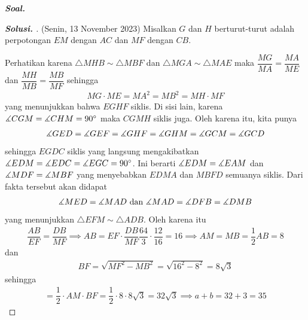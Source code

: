 \textbf{\textit{Soal. }}
\begin{proof}[\textbf{Solusi. }] (Senin, 13 November 2023) Misalkan $G$ dan $H$ berturut-turut adalah perpotongan $EM$ dengan $AC$ dan $MF$ dengan $CB$. 
% 

Perhatikan karena $\triangle MHB \sim \triangle MBF$ dan $\triangle MGA \sim \triangle MAE$ maka $\dfrac{MG}{MA} = \dfrac{MA}{ME}$ dan $\dfrac{MH}{MB}=\dfrac{MB}{MF}$ sehingga
\begin{align*}
    MG \cdot ME = MA^2 = MB^2 = MH \cdot MF
\end{align*}
yang menunjukkan bahwa $EGHF$ siklis.  Di sisi lain, karena $\measuredangle CGM = \measuredangle CHM = 90^\circ$ maka $CGMH$ siklis juga. Oleh karena itu, kita punya
\begin{align*}
    \measuredangle GED = \measuredangle GEF = \measuredangle GHF = \measuredangle GHM = \measuredangle GCM = \measuredangle GCD
\end{align*}
sehingga $EGDC$ siklis yang langsung mengakibatkan $\measuredangle EDM = \measuredangle EDC = \measuredangle EGC = 90^\circ$. Ini berarti $\measuredangle EDM = \measuredangle EAM$ dan $\measuredangle MDF = \measuredangle MBF$ yang menyebabkan $EDMA$ dan $MBFD$ semuanya siklis. Dari fakta tersebut akan didapat
\begin{align*}
    \measuredangle MED = \measuredangle MAD \text{ dan } \measuredangle MAD = \measuredangle DFB = \measuredangle DMB
\end{align*}
yang menunjukkan $\triangle EFM \sim \triangle ADB$. Oleh karena itu
\begin{align*}
    \dfrac{AB}{EF} = \dfrac{DB}{MF} \implies AB = EF\cdot\dfrac{DB}{MF}\dfrac{64}{3}\cdot\dfrac{12}{16}= 16 \implies AM= MB = \dfrac{1}{2}AB=8
\end{align*}
dan
\begin{align*}
    BF=\sqrt{MF^2-MB^2}=\sqrt{16^2-8^2}=8\sqrt{3}
\end{align*}
sehingga
\begin{align*}
    [AMF] = \dfrac{1}{2}\cdot AM \cdot BF = \dfrac{1}{2} \cdot 8 \cdot 8\sqrt{3} = 32\sqrt{3} \implies a+b = 32 + 3 = \boxed{35}
\end{align*}
\end{proof}
